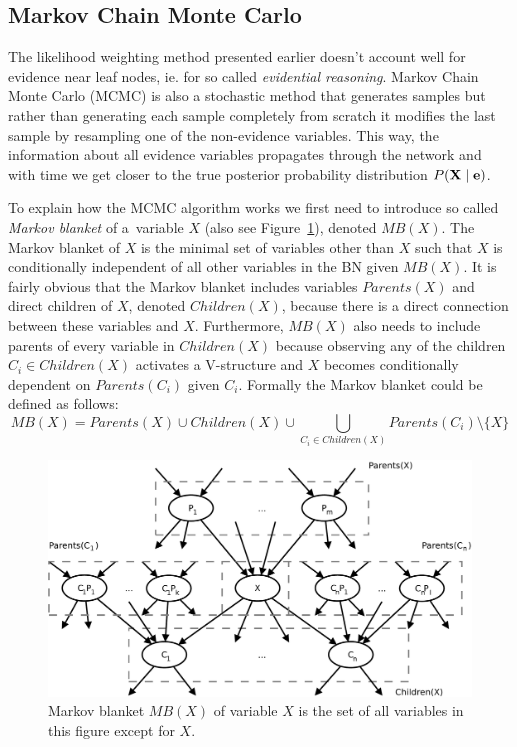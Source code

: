 \documentclass[english,cover]{fitthesis} %
\newcommand{\term}[1]{\emph{#1}}           %
\newcommand{\vars}[1]{{\bold{#1}}}         %
\begin{document}
\subsection{Markov Chain Monte Carlo}
The likelihood weighting method presented earlier doesn't account well for evidence near leaf nodes, ie. for so called \term{evidential reasoning}. Markov Chain Monte Carlo (MCMC) is also a stochastic method that generates samples but rather than generating each sample completely from scratch it modifies the last sample by resampling one of the non-evidence variables. This way, the information about all evidence variables propagates through the network and with time we get closer to the true posterior probability distribution $P(\vars{X} \mid \vars{e})$.

To explain how the MCMC algorithm works we first need to introduce so called \term{Markov blanket} of a~variable $X$ (also see Figure~\ref{fig:bn-markov-blanket}), denoted $MB(X)$. The Markov blanket of $X$ is the minimal set of variables other than $X$ such that $X$ is conditionally independent of all other variables in the BN given $MB(X)$. It is fairly obvious that the Markov blanket includes variables $Parents(X)$ and direct children of $X$, denoted $Children(X)$, because there is a direct connection between these variables and $X$. Furthermore, $MB(X)$ also needs to include parents of every variable in $Children(X)$ because observing any of the children $C_i \in Children(X)$ activates a V-structure and $X$ becomes conditionally dependent on $Parents(C_i)$ given $C_i$. Formally the Markov blanket could be defined as follows:
\begin{equation*}
MB(X) = Parents(X) \cup Children(X) \cup \!\!\!\!\!\!\!\! \bigcup_{C_i \in Children(X)} \!\!\!\!\!\!\!\!\!\!\!\! Parents(C_i) \setminus \lbrace X \rbrace
\end{equation*}

\begin{center}
\begin{figure}[h]
    \begin{center}
    \includegraphics[scale=0.4]{fig/bn-markov_blanket}
    \end{center}
    \caption{Markov blanket $MB(X)$ of variable $X$ is the set of all variables in this figure except for $X$.}
    \label{fig:bn-markov-blanket}
\end{figure}
\end{center}
\end{document}
